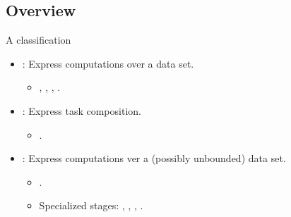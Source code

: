 \subsection{Overview}

\begin{frame}[t]{A classification}
\begin{itemize}
  \item {}: Express computations over a data set.
    \begin{itemize}
      \item {}, , , . 
    \end{itemize}

  \vfill\pause
  \item {}: Express task composition.
    \begin{itemize}
      \item {}.
    \end{itemize}

  \vfill\pause
  \item {}: Express computations ver a (possibly unbounded) data set.
    \begin{itemize}
      \item {}.
      \item Specialized stages: , , 
            , .
    \end{itemize}
\end{itemize}
\end{frame}
